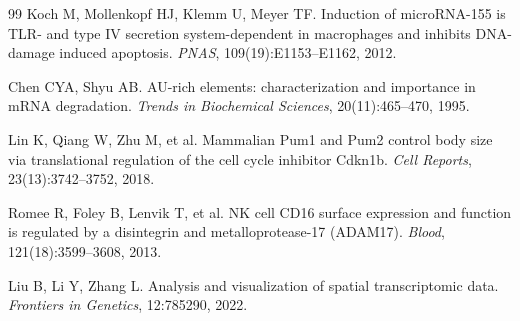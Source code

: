 \documentclass[11pt,a4paper]{article}
\begin{document}
\begin{thebibliography}{99}
Koch M, Mollenkopf HJ, Klemm U, Meyer TF.
Induction of microRNA-155 is TLR- and type IV secretion system-dependent in macrophages and inhibits DNA-damage induced apoptosis.
\textit{PNAS}, 109(19):E1153--E1162, 2012.

Chen CYA, Shyu AB.
AU-rich elements: characterization and importance in mRNA degradation.
\textit{Trends in Biochemical Sciences}, 20(11):465--470, 1995.

Lin K, Qiang W, Zhu M, et al.
Mammalian Pum1 and Pum2 control body size via translational regulation of the cell cycle inhibitor Cdkn1b.
\textit{Cell Reports}, 23(13):3742--3752, 2018.

Romee R, Foley B, Lenvik T, et al.
NK cell CD16 surface expression and function is regulated by a disintegrin and metalloprotease-17 (ADAM17).
\textit{Blood}, 121(18):3599--3608, 2013.

Liu B, Li Y, Zhang L.
Analysis and visualization of spatial transcriptomic data.
\textit{Frontiers in Genetics}, 12:785290, 2022.

\end{thebibliography}
\end{document}
